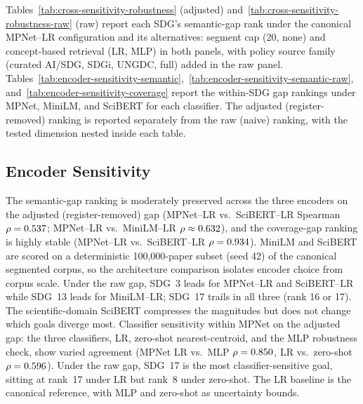 \documentclass[12pt,a4paper]{article}
\begin{document}
Tables~\ref{tab:cross-sensitivity-robustness} (adjusted) and~\ref{tab:cross-sensitivity-robustness-raw} (raw) report each SDG's semantic-gap rank under the canonical MPNet--LR configuration and its alternatives: segment cap (20, none) and concept-based retrieval (LR, MLP) in both panels, with policy source family (curated AI/SDG, SDGi, UNGDC, full) added in the raw panel. Tables~\ref{tab:encoder-sensitivity-semantic},~\ref{tab:encoder-sensitivity-semantic-raw}, and~\ref{tab:encoder-sensitivity-coverage} report the within-SDG gap rankings under MPNet, MiniLM, and SciBERT for each classifier. The adjusted (register-removed) ranking is reported separately from the raw (naive) ranking, with the tested dimension nested inside each table.





\subsection{Encoder Sensitivity}\label{sec:encoder-sensitivity}

The semantic-gap ranking is moderately preserved across the three encoders on the adjusted (register-removed) gap (MPNet--LR vs.\ SciBERT--LR Spearman $\rho = 0.537$; MPNet--LR vs.\ MiniLM--LR $\rho \approx 0.632$), and the coverage-gap ranking is highly stable (MPNet--LR vs.\ SciBERT--LR $\rho = 0.934$). MiniLM and SciBERT are scored on a deterministic 100,000-paper subset (seed 42) of the canonical segmented corpus, so the architecture comparison isolates encoder choice from corpus scale. Under the raw gap, SDG~3 leads for MPNet--LR and SciBERT--LR while SDG~13 leads for MiniLM--LR; SDG~17 trails in all three (rank 16 or 17). The scientific-domain SciBERT compresses the magnitudes but does not change which goals diverge most. Classifier sensitivity within MPNet on the adjusted gap: the three classifiers, LR, zero-shot nearest-centroid, and the MLP robustness check, show varied agreement (MPNet LR vs.\ MLP $\rho = 0.850$, LR vs.\ zero-shot $\rho = 0.596$). Under the raw gap, SDG~17 is the most classifier-sensitive goal, sitting at rank~17 under LR but rank~8 under zero-shot. The LR baseline is the canonical reference, with MLP and zero-shot as uncertainty bounds.


\end{document}
